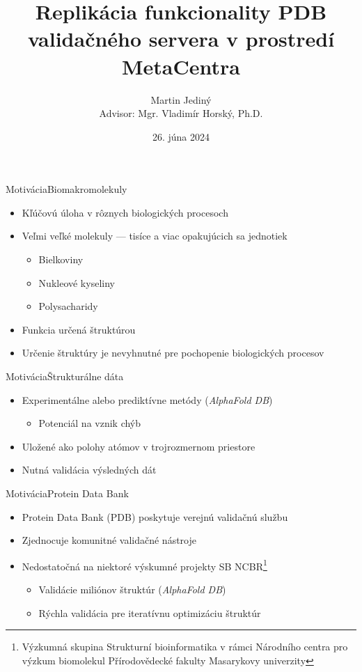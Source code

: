 \documentclass[
  aspectratio=169,
]{beamer}
\title[Structure Quality Control]{Replikácia funkcionality PDB validačného servera v prostredí MetaCentra}
\subtitle[Alternatívny názov prezentácie]{}
\author[M.\, Jediný]{Martin Jediný \\
  Advisor: Mgr. Vladimír Horský, Ph.D.}
\institute[FI MU]{Fakulta informatiky Masarykovej univerzity}
\date{26. júna 2024}
\begin{document}
\begin{frame}[plain]
	\maketitle
\end{frame}

\begin{frame}{Motivácia}{Biomakromolekuly}
	\begin{itemize}
		\item Kľúčovú úloha v rôznych biologických procesoch
		\item Veľmi veľké molekuly --- tisíce a viac opakujúcich sa jednotiek
		      \begin{itemize}
			      \item Bielkoviny
			      \item Nukleové kyseliny
			      \item Polysacharidy
		      \end{itemize}
		\item Funkcia určená štruktúrou
		\item Určenie štruktúry je nevyhnutné pre pochopenie biologických procesov
	\end{itemize}
\end{frame}

\begin{frame}{Motivácia}{Štrukturálne dáta}
	\begin{itemize}
		\item Experimentálne alebo prediktívne metódy (\emph {AlphaFold DB})
		      \begin{itemize}
			      \item Potenciál na vznik chýb
		      \end{itemize}
		\item Uložené ako polohy atómov v trojrozmernom priestore
		\item Nutná validácia výsledných dát
	\end{itemize}
\end{frame}

\begin{frame}{Motivácia}{Protein Data Bank}
	\begin{itemize}
		\item Protein Data Bank (PDB) poskytuje verejnú validačnú službu
		\item Zjednocuje komunitné validačné nástroje
		\item Nedostatočná na niektoré výskumné projekty SB NCBR\footnote{Výzkumná skupina Strukturní bioinformatika v rámci Národního centra pro výzkum biomolekul Přírodovědecké fakulty Masarykovy univerzity}
		      \begin{itemize}
			      \item Validácie miliónov štruktúr (\emph{AlphaFold DB})
			      \item Rýchla validácia pre iteratívnu optimizáciu štruktúr
		      \end{itemize}
	\end{itemize}
\end{frame}
\end{document}
